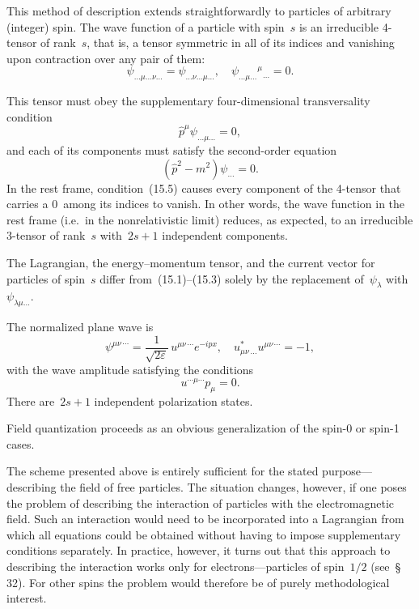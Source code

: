 This method of description extends straightforwardly to particles of arbitrary (integer) spin. The wave function of a particle with spin~$s$ is an irreducible 4-tensor of rank~$s$, that is, a tensor symmetric in all of its indices and vanishing upon contraction over any pair of them:
\begin{equation}
\psi_{\ldots\mu\ldots\nu\ldots} = \psi_{\ldots\nu\ldots\mu\ldots}, \quad \psi_{\ldots\mu\ldots}{}^\mu{}_{\ldots} = 0.
\tag{15.4}
\end{equation}

This tensor must obey the supplementary four-dimensional transversality condition
\begin{equation}
\hat{p}^\mu\psi_{\ldots\mu\ldots} = 0,
\tag{15.5}
\end{equation}
and each of its components must satisfy the second-order equation
\begin{equation}
(\hat{p}^2 - m^2)\psi_{\ldots} = 0.
\tag{15.6}
\end{equation}
In the rest frame, condition~(15.5) causes every component of the 4-tensor that carries a 0~among its indices to vanish. In other words, the wave function in the rest frame (i.e.\ in the nonrelativistic limit) reduces, as expected, to an irreducible 3-tensor of rank~$s$ with~$2s + 1$ independent components.

The Lagrangian, the energy--momentum tensor, and the current vector for particles of spin~$s$ differ from~(15.1)--(15.3) solely by the replacement of~$\psi_\lambda$ with~$\psi_{\lambda\mu\ldots}$.

The normalized plane wave is
\begin{equation}
\psi^{\mu\nu\,\cdots} = \frac{1}{\sqrt{2\varepsilon}}\,u^{\mu\nu\,\cdots}e^{-ipx}, \quad u^*_{\mu\nu\,\ldots}u^{\mu\nu\,\cdots} = -1,
\tag{15.7}
\end{equation}
with the wave amplitude satisfying the conditions
\begin{equation}
u^{\cdots\mu\cdots}p_\mu = 0.
\tag{15.8}
\end{equation}
There are~$2s + 1$ independent polarization states.

Field quantization proceeds as an obvious generalization of the spin-0 or spin-1 cases.

The scheme presented above is entirely sufficient for the stated purpose---describing the field of free particles. The situation changes, however, if one poses the problem of describing the interaction of particles with the electromagnetic field. Such an interaction would need to be incorporated into a Lagrangian from which all equations could be obtained without having to impose supplementary conditions separately. In practice, however, it turns out that this approach to describing the interaction works only for electrons---particles of spin~$1/2$ (see~\S\,32). For other spins the problem would therefore be of purely methodological interest.

